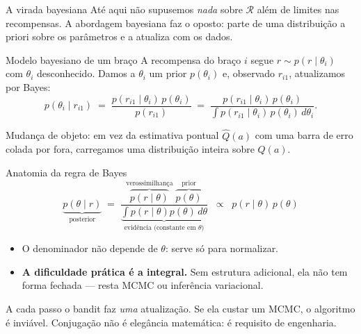 \documentclass[aspectratio=169, 11pt]{beamer}
\begin{document}
\begin{frame}{A virada bayesiana}
  Até aqui não supusemos \emph{nada} sobre $\mathcal{R}$ além de limites
  nas recompensas. A abordagem bayesiana faz o oposto: parte de uma
  distribuição \alert{a priori} sobre os parâmetros e a atualiza com os
  dados.

  \begin{defbox}{Modelo bayesiano de um braço}
    A recompensa do braço $i$ segue $r \sim p(r \mid \theta_i)$ com
    $\theta_i$ \alert{desconhecido}. Damos a $\theta_i$ um prior
    $p(\theta_i)$ e, observado $r_{i1}$, atualizamos por Bayes:
    \vspace{-0.6em}
    \[
      p(\theta_i \mid r_{i1})
      \;=\;
      \frac{p(r_{i1}\mid\theta_i)\,p(\theta_i)}{p(r_{i1})}
      \;=\;
      \frac{p(r_{i1}\mid\theta_i)\,p(\theta_i)}
           {\int p(r_{i1}\mid\theta_i)\,p(\theta_i)\,d\theta_i}.
    \]
    \vspace{-1.1em}
  \end{defbox}

  \begin{ideiabox}
    Mudança de objeto: em vez da estimativa pontual $\hat{Q}(a)$ com uma
    barra de erro colada por fora, carregamos uma \alert{distribuição
    inteira} sobre $Q(a)$.
  \end{ideiabox}
\end{frame}

\begin{frame}{Anatomia da regra de Bayes}
  \[
    \underbrace{p(\theta \mid r)}_{\text{posterior}}
    \;=\;
    \frac{\;\overbrace{p(r \mid \theta)}^{\text{verossimilhança}}\;
          \overbrace{p(\theta)}^{\text{prior}}\;}
         {\underbrace{\textstyle\int p(r\mid\theta)p(\theta)\,d\theta}_{\text{evidência (constante em }\theta)}}
    \;\;\propto\;\;
    p(r \mid \theta)\, p(\theta)
  \]

  \begin{itemize}
    \item O denominador não depende de $\theta$: serve só para normalizar.
    \item \textbf{A dificuldade prática é a integral.} Sem estrutura
          adicional, ela não tem forma fechada — resta MCMC ou inferência
          variacional.
  \end{itemize}

  \begin{alertabox}
    A cada passo o bandit faz \emph{uma} atualização. Se ela custar um
    MCMC, o algoritmo é inviável. Conjugação não é elegância matemática:
    é requisito de engenharia.
  \end{alertabox}
\end{frame}
\end{document}
